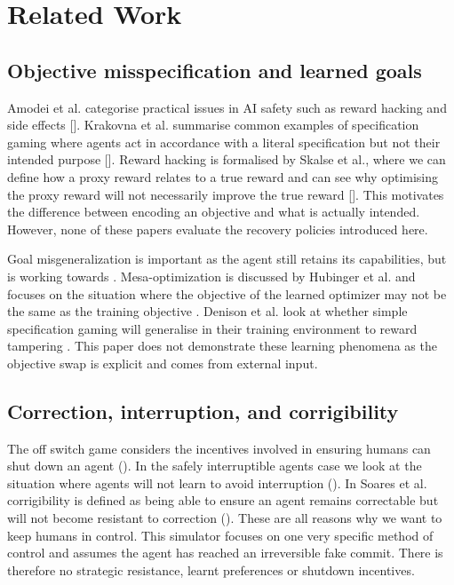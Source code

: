 \documentclass[conference]{IEEEtran}
\begin{document}
\section{Related Work}
\subsection{Objective misspecification and learned goals}
Amodei et al. categorise practical issues in AI safety such as reward hacking and side effects [\cite{amodei2016}]. Krakovna et al. summarise common examples of specification gaming where agents act in accordance with a literal specification but not their intended purpose [\cite{specgaming2020}]. Reward hacking is formalised by Skalse et al., where we can define how a proxy reward relates to a true reward and can see why optimising the proxy reward will not necessarily improve the true reward [\cite{skalse2022}]. This motivates the difference between encoding an objective and what is actually intended. However, none of these papers evaluate the recovery policies introduced here.

Goal misgeneralization is important as the agent still retains its capabilities, but is working towards \cite{langosco2022}. Mesa-optimization is discussed by Hubinger et al. and focuses on the situation where the objective of the learned optimizer may not be the same as the training objective \cite{hubinger2019}. Denison et al. look at whether simple specification gaming will generalise in their training environment to reward tampering \cite{denison2024}. This paper does not demonstrate these learning phenomena as the objective swap is explicit and comes from external input.


\subsection{Correction, interruption, and corrigibility}
The off switch game considers the incentives involved in ensuring humans can shut down an agent (\cite{hadfield2017}). In the safely interruptible agents case we look at the situation where agents will not learn to avoid interruption (\cite{orseau2016}). In Soares et al. corrigibility is defined as being able to ensure an agent remains correctable but will not become resistant to correction (\cite{soares2015}). These are all reasons why we want to keep humans in control. This simulator focuses on one very specific method of control and assumes the agent has reached an irreversible fake commit. There is therefore no strategic resistance, learnt preferences or shutdown incentives.
\end{document}
